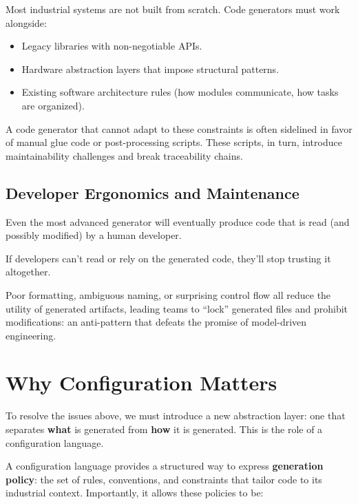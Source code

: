 Most industrial systems are not built from scratch. Code generators must work alongside:

\begin{itemize}
	\item Legacy libraries with non-negotiable APIs.
	\item Hardware abstraction layers that impose structural patterns.
	\item Existing software architecture rules (how modules communicate, how tasks are organized).
\end{itemize}

A code generator that cannot adapt to these constraints is often sidelined in favor of manual glue code or post-processing scripts. These scripts, in turn, introduce maintainability challenges and break traceability chains.

\subsection*{Developer Ergonomics and Maintenance}

Even the most advanced generator will eventually produce code that is read (and possibly modified) by a human developer. 

\begin{tcolorbox}[colback=green!8]
	If developers can’t read or rely on the generated code, they’ll stop trusting it altogether.
\end{tcolorbox}

Poor formatting, ambiguous naming, or surprising control flow all reduce the utility of generated artifacts, leading teams to “lock” generated files and prohibit modifications: an anti-pattern that defeats the promise of model-driven engineering.

\section{Why Configuration Matters}
\label{sec:why_configuration_matters}

To resolve the issues above, we must introduce a new abstraction layer: one that separates \textbf{what} is generated from \textbf{how} it is generated. This is the role of a configuration language.

A configuration language provides a structured way to express \textbf{generation policy}: the set of rules, conventions, and constraints that tailor code to its industrial context. Importantly, it allows these policies to be:

